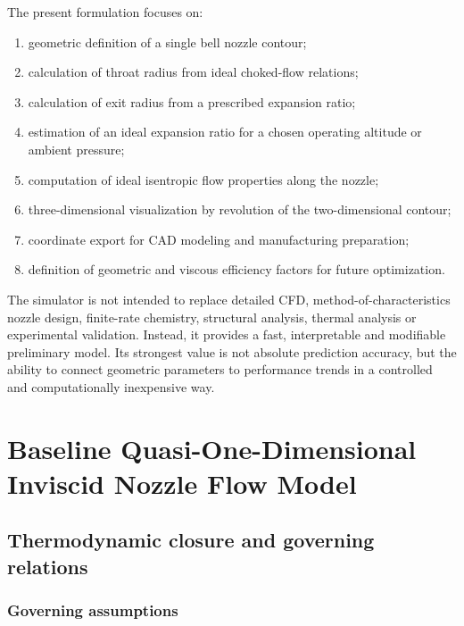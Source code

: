 \documentclass[11pt,a4paper]{article}
\begin{document}
The present formulation focuses on:
\begin{enumerate}
    \item geometric definition of a single bell nozzle contour;
    \item calculation of throat radius from ideal choked-flow relations;
    \item calculation of exit radius from a prescribed expansion ratio;
    \item estimation of an ideal expansion ratio for a chosen operating altitude or ambient pressure;
    \item computation of ideal isentropic flow properties along the nozzle;
    \item three-dimensional visualization by revolution of the two-dimensional contour;
    \item coordinate export for CAD modeling and manufacturing preparation;
    \item definition of geometric and viscous efficiency factors for future optimization.
\end{enumerate}

The simulator is not intended to replace detailed CFD, method-of-characteristics nozzle design, finite-rate chemistry, structural analysis, thermal analysis or experimental validation. Instead, it provides a fast, interpretable and modifiable preliminary model. Its strongest value is not absolute prediction accuracy, but the ability to connect geometric parameters to performance trends in a controlled and computationally inexpensive way.

\section{Baseline Quasi-One-Dimensional Inviscid Nozzle Flow Model}

\subsection{Thermodynamic closure and governing relations}

\subsubsection{Governing assumptions}
\end{document}
